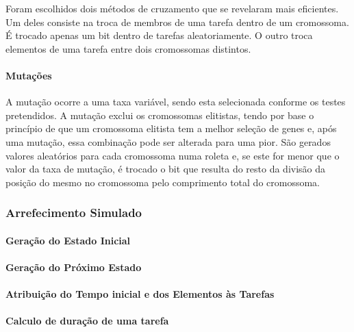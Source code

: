 \begin{titlepage}
Foram escolhidos dois métodos de cruzamento que se revelaram mais eficientes. Um deles consiste na troca de membros de uma tarefa dentro de um cromossoma. É trocado apenas um bit dentro de tarefas aleatoriamente. O outro troca elementos de uma tarefa entre dois cromossomas distintos.

\paragraph{Mutações}

A mutação ocorre a uma taxa variável, sendo esta selecionada conforme os testes pretendidos. A mutação exclui os cromossomas elitistas, tendo por base o princípio de que um cromossoma elitista tem a melhor seleção de genes e, após uma mutação, essa combinação pode ser alterada para uma pior. São gerados valores aleatórios para cada cromossoma numa roleta e, se este for menor que o valor da taxa de mutação, é trocado o bit que resulta do resto da divisão da posição do mesmo no cromossoma pelo comprimento total do cromossoma.


\subsubsection{Arrefecimento Simulado}
\justify\normalsize

\paragraph{Geração do Estado Inicial}
\paragraph{Geração do Próximo Estado}
\paragraph{Atribuição do Tempo inicial e dos Elementos às Tarefas }
\paragraph{Calculo de duração de uma tarefa}


\end{titlepage}
